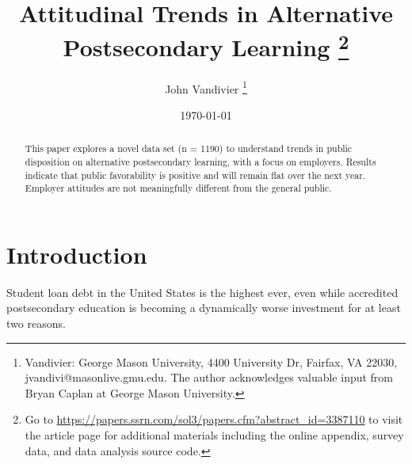 \documentclass[AER]{./aea-latex-templates/AEA}
\begin{document}
        
        \title{Attitudinal Trends in Alternative Postsecondary Learning
            \thanks{
                Go to \url{https://papers.ssrn.com/sol3/papers.cfm?abstract_id=3387110} to visit
                the article page for additional materials including the online appendix,
                survey data, and data analysis source code.
            }
        }
        \author{John Vandivier
            \thanks{
                    Vandivier: George Mason University,
                    4400 University Dr, Fairfax, VA 22030,
                    jvandivi@masonlive.gmu.edu.
                    The author acknowledges valuable input from Bryan Caplan at George Mason University.
                }
            }
        \date{\today}

        \begin{abstract}
        This paper explores a novel data set (n = 1190) to understand trends in public
        disposition on alternative postsecondary learning, with a focus on employers.
        Results indicate that public favorability is positive and will remain flat over the next year.
        Employer attitudes are not meaningfully different from the general public.
        \end{abstract}

        \maketitle
        
        \section{Introduction}

        Student loan debt in the United States is the highest ever\cite{friedman2018student},
        even while accredited postsecondary education is becoming a dynamically worse investment
        for at least two reasons.
\end{document}
